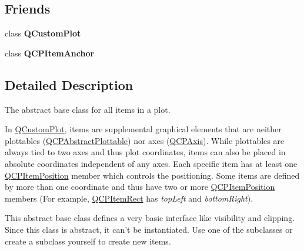 \subsection*{\-Friends}
\begin{DoxyCompactItemize}
\item 
\hypertarget{classQCPAbstractItem_a1cdf9df76adcfae45261690aa0ca2198}{class {\bfseries \-Q\-Custom\-Plot}}\label{classQCPAbstractItem_a1cdf9df76adcfae45261690aa0ca2198}

\item 
\hypertarget{classQCPAbstractItem_a61767d414fd57af9eb1741b34268c7fc}{class {\bfseries \-Q\-C\-P\-Item\-Anchor}}\label{classQCPAbstractItem_a61767d414fd57af9eb1741b34268c7fc}

\end{DoxyCompactItemize}


\subsection{\-Detailed \-Description}
\-The abstract base class for all items in a plot. 

\-In \hyperlink{classQCustomPlot}{\-Q\-Custom\-Plot}, items are supplemental graphical elements that are neither plottables (\hyperlink{classQCPAbstractPlottable}{\-Q\-C\-P\-Abstract\-Plottable}) nor axes (\hyperlink{classQCPAxis}{\-Q\-C\-P\-Axis}). \-While plottables are always tied to two axes and thus plot coordinates, items can also be placed in absolute coordinates independent of any axes. \-Each specific item has at least one \hyperlink{classQCPItemPosition}{\-Q\-C\-P\-Item\-Position} member which controls the positioning. \-Some items are defined by more than one coordinate and thus have two or more \hyperlink{classQCPItemPosition}{\-Q\-C\-P\-Item\-Position} members (\-For example, \hyperlink{classQCPItemRect}{\-Q\-C\-P\-Item\-Rect} has {\itshape top\-Left\/} and {\itshape bottom\-Right\/}).

\-This abstract base class defines a very basic interface like visibility and clipping. \-Since this class is abstract, it can't be instantiated. \-Use one of the subclasses or create a subclass yourself to create new items.


